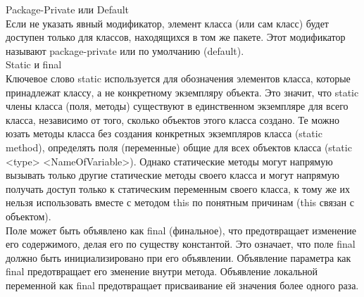 Package-Private или Default \\
Если не указать явный модификатор, элемент класса (или сам класс) будет доступен только для классов, находящихся в том же пакете. Этот модификатор называют package-private или по умолчанию (default). \\
Static и final \\
Ключевое слово static используется для обозначения элементов класса, которые принадлежат классу, а не конкретному экземпляру объекта. Это значит, что static члены класса (поля, методы) существуют в единственном экземпляре для всего класса, независимо от того, сколько объектов этого класса создано. Те можно юзать методы класса без создания конкретных экземпляров класса (static method), определять поля (переменные) общие для всех объектов класса (static <type> <NameOfVariable>). Однако статические методы могут напрямую вызывать только другие статические методы своего класса и могут напрямую получать доступ только к статическим переменным своего класса, к тому же их нельзя использовать вместе с методом this по понятным причинам (this связан с объектом). \\
Поле может быть объявлено как final (финальное), что предотвращает изменение его содержимого, делая его по существу константой. Это означает, что поле final должно быть инициализировано при его объявлении. Объявление параметра как final предотвращает его зменение внутри метода. Объявление локальной переменной как final предотвращает присваивание ей значения более одного раза. 



